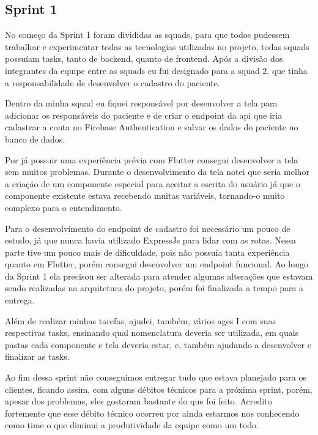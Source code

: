 \subsection{Sprint 1}

No começo da Sprint 1 foram divididas as squads, para que todos pudessem trabalhar e experimentar todas as tecnologias utilizadas no projeto, todas squads possuíam tasks, tanto de backend, quanto de frontend. Após a divisão dos integrantes da equipe entre as squads eu fui designado para a squad 2, que tinha a responsabilidade de desenvolver o cadastro do paciente.

Dentro da minha squad eu fiquei responsável por desenvolver a tela para adicionar os responsáveis do paciente e de criar o endpoint da \ac{api} que iria cadastrar a conta no 
Firebase Authentication\cite{firebaseauth} e salvar os dados do paciente no banco de dados.

Por já possuir uma experiência prévia com Flutter\cite{flutter} consegui desenvolver a tela sem muitos problemas. Durante o desenvolvimento da tela notei que seria melhor a criação de um componente especial para aceitar a escrita do usuário já que o componente existente estava recebendo muitas variáveis, tornando-o muito complexo para o entendimento.

Para o desenvolvimento do endpoint de cadastro foi necessário um pouco de estudo, já que nunca havia utilizado ExpressJs\cite{expressjs} para lidar com as rotas. Nessa parte tive um pouco mais de dificuldade, pois não possuía tanta experiência quanto em Flutter\cite{flutter}, porém consegui desenvolver um endpoint funcional. Ao longo da Sprint 1 ela precisou ser alterada para atender algumas alterações que estavam sendo realizadas na arquitetura do projeto, porém foi finalizada a tempo para a entrega. 

Além de realizar minhas tarefas, ajudei, também, vários \ac{ages} I com suas respectivas tasks, ensinando qual nomenclatura deveria ser utilizada, em quais pastas cada componente e tela deveria estar, e, também ajudando a desenvolver e finalizar as tasks. 

Ao fim dessa sprint não conseguimos entregar tudo que estava planejado para os clientes, ficando assim, com alguns débitos técnicos para a próxima sprint, porém, apesar dos problemas, eles gostaram bastante do que foi feito. Acredito fortemente que esse débito técnico ocorreu por ainda estarmos nos conhecendo como time o que diminui a produtividade da equipe como um todo.
